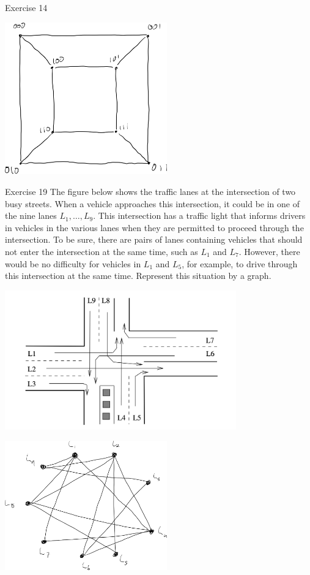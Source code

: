 \documentclass[12pt]{extarticle}
\begin{document}
{\begin{problem}{Exercise 14}
    \begin{center}
      \includegraphics[width=7cm]{exercise_14_solution}
    \end{center}
  \end{problem}
  \begin{problem}{Exercise 19}
    The figure below shows the traffic lanes at the intersection of two busy streets. When a vehicle approaches this intersection, it could be in one of the nine lanes $L_1,\dots,L_9$. This intersection has a traffic light that informs drivers in vehicles in the various lanes when they are permitted to proceed through the intersection. To be sure, there are pairs of lanes containing vehicles that should not enter the intersection at the same time, such as $L_1$ and $L_7$. However, there would be no difficulty for vehicles in $L_1$ and $L_5$, for example, to drive through this intersection at the same time. Represent this situation by a graph.
    \begin{center}
      \includegraphics[width=10cm]{exercise_19}
    \end{center}
    \tcblower
    \begin{center}
      \includegraphics[width=7cm]{exercise_19_solution}
    \end{center}
  \end{problem}
}
\end{document}
